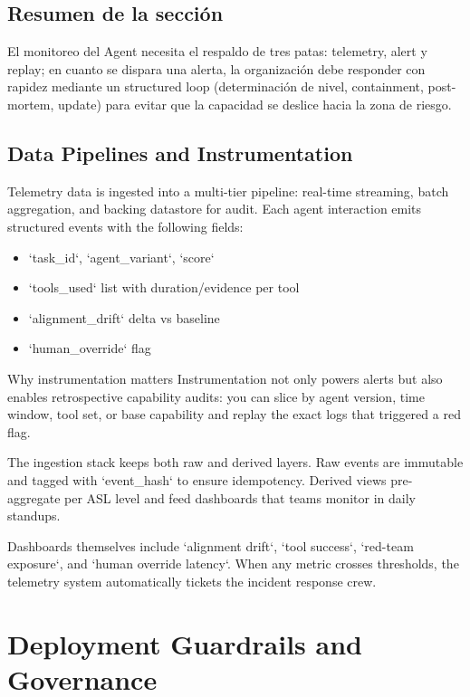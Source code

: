 \documentclass[a4paper]{article}
\begin{document}
\subsection{Resumen de la sección}

El monitoreo del Agent necesita el respaldo de tres patas: telemetry, alert y replay; en cuanto se dispara una alerta, la organización debe responder con rapidez mediante un structured loop (determinación de nivel, containment, post-mortem, update) para evitar que la capacidad se deslice hacia la zona de riesgo.

\subsection{Data Pipelines and Instrumentation}

Telemetry data is ingested into a multi-tier pipeline: real-time streaming, batch aggregation, and backing datastore for audit. Each agent interaction emits structured events with the following fields:

\begin{itemize}
    \item `task\_id`, `agent\_variant`, `score`
    \item `tools\_used` list with duration/evidence per tool
    \item `alignment\_drift` delta vs baseline
    \item `human\_override` flag
\end{itemize}

\begin{importantbox}{Why instrumentation matters}
Instrumentation not only powers alerts but also enables retrospective capability audits: you can slice by agent version, time window, tool set, or base capability and replay the exact logs that triggered a red flag.
\end{importantbox}

The ingestion stack keeps both raw and derived layers. Raw events are immutable and tagged with `event\_hash` to ensure idempotency. Derived views pre-aggregate per ASL level and feed dashboards that teams monitor in daily standups.

Dashboards themselves include `alignment drift`, `tool success`, `red-team exposure`, and `human override latency`. When any metric crosses thresholds, the telemetry system automatically tickets the incident response crew.

\section{Deployment Guardrails and Governance}
\end{document}
